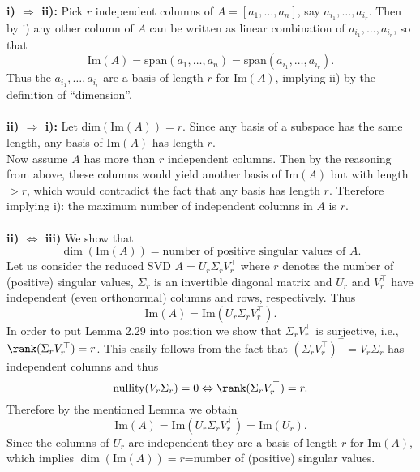 {\color{solution}
\textbf{i) $\Rightarrow$ ii):} Pick $r$ independent columns of $A = [a_1,\ldots,a_n]$, say $a_{i_1},\ldots,a_{i_r}$. Then by i) any other column of $A$ can be written as linear combination of $a_{i_1},\ldots,a_{i_r}$, so that $$\text{Im}(A)= \text{span}(a_{1},\ldots,a_{n})= \text{span}(a_{i_1},\ldots,a_{i_r}).$$ Thus the $a_{i_1},\ldots,a_{i_r}$ are a basis of length $r$ for $\text{Im}(A)$, implying ii) by the definition of ``dimension''.\\~\\
\textbf{ii) $\Rightarrow$ i):} 
Let $\text{dim}(\text{Im}(A))= r$. Since any basis of a subspace has the same length, any basis of $\text{Im}(A)$ has length $r$.\\
Now assume $A$ has more than $r$ independent columns. Then by the reasoning from above, these columns would yield another basis of $\text{Im}(A)$ but with length $>r$, which would contradict the fact that any basis has length $r$. Therefore implying i): the maximum number of independent columns in $A$ is $r$. \\~\\
\textbf{ii) $\Leftrightarrow$ iii)} We show that $$\dim(\text{Im}(A)) = \text{number of positive singular values of }A .$$
Let us consider the reduced SVD $A = U_r \Sigma_r V_r^\top$ where $r$ denotes the number of (positive) singular values, $\Sigma_r$ is an invertible diagonal matrix and $U_r$ and $V_r^\top$ have independent (even orthonormal) columns and rows, respectively. Thus
$$\text{Im}(A) = \text{Im}(U_r \Sigma_r V_r^\top). $$
In order to put Lemma 2.29 into position we show that $\Sigma_r V_r^\top$ is surjective, i.e., $\rank(\Sigma_r V_r^\top) = r$. This easily follows from the fact that $(\Sigma_r V_r^\top)^\top = V_r\Sigma_r $ has independent columns and thus $$\text{nullity}(V_r\Sigma_r) = 0 \Leftrightarrow \rank(\Sigma_r V_r^\top) = r.$$ Therefore by the mentioned Lemma we obtain
$$\text{Im}(A) = \text{Im}(U_r \Sigma_r V_r^\top)= \text{Im}(U_r).$$
Since the columns of $U_r$ are independent they are a basis of length $r$ for $\text{Im}(A)$, which implies $\dim(\text{Im}(A))=r$=number of (positive) singular values.

}

